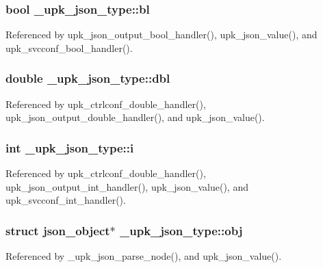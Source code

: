 \subsubsection[{bl}]{\setlength{\rightskip}{0pt plus 5cm}bool {\bf \_\-upk\_\-json\_\-type::bl}}\label{struct__upk__json__type_aad607b1d4759fe0fa7525789592e18f2}


Referenced by upk\_\-json\_\-output\_\-bool\_\-handler(), upk\_\-json\_\-value(), and upk\_\-svcconf\_\-bool\_\-handler().

\subsubsection[{dbl}]{\setlength{\rightskip}{0pt plus 5cm}double {\bf \_\-upk\_\-json\_\-type::dbl}}\label{struct__upk__json__type_ac4e041911e770d955fd0318fe8e9ef1e}


Referenced by upk\_\-ctrlconf\_\-double\_\-handler(), upk\_\-json\_\-output\_\-double\_\-handler(), and upk\_\-json\_\-value().

\subsubsection[{i}]{\setlength{\rightskip}{0pt plus 5cm}int {\bf \_\-upk\_\-json\_\-type::i}}\label{struct__upk__json__type_a461839ba2cd1bf2127121bda9c362a06}


Referenced by upk\_\-ctrlconf\_\-double\_\-handler(), upk\_\-json\_\-output\_\-int\_\-handler(), upk\_\-json\_\-value(), and upk\_\-svcconf\_\-int\_\-handler().

\subsubsection[{obj}]{\setlength{\rightskip}{0pt plus 5cm}struct json\_\-object$\ast$ {\bf \_\-upk\_\-json\_\-type::obj}}\label{struct__upk__json__type_a465bb44c188f1e4b85840cd9ba933a91}


Referenced by \_\-upk\_\-json\_\-parse\_\-node(), and upk\_\-json\_\-value().


